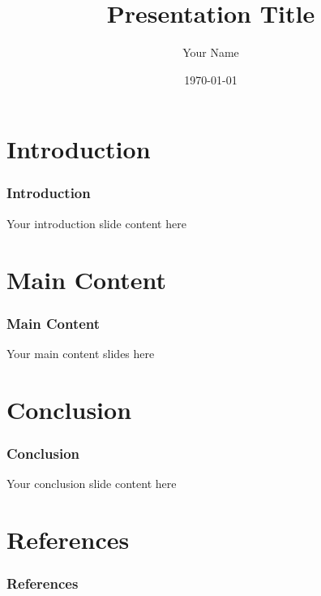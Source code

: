 \documentclass{beamer}
\title{Presentation Title}
\author{Your Name}
\date{\today}
\begin{document}
\frame{\titlepage}

\section{Introduction}
\begin{frame}
    \frametitle{Introduction}
    Your introduction slide content here
\end{frame}

\section{Main Content}
\begin{frame}
    \frametitle{Main Content}
    Your main content slides here
\end{frame}

\section{Conclusion}
\begin{frame}
    \frametitle{Conclusion}
    Your conclusion slide content here
\end{frame}

\section{References}
\begin{frame}
    \frametitle{References}
    \printbibliography
\end{frame}
\end{document}
